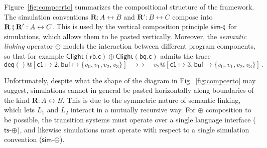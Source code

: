 \documentclass[acmsmall,screen,review,anonymous]{acmart}
\newcommand{\kw}[1]{\ensuremath{ \mathsf{#1} }}
\newcommand{\vcomp}{\fatsemi}
\begin{document}
Figure~\ref{fig:compcerto}
summarizes the compositional structure of the framework.
The simulation conventions $\mathbf{R} : A \leftrightarrow B$ and
$\mathbf{R}' : B \leftrightarrow C$
compose into
$\mathbf{R} \vcomp \mathbf{R}' : A \leftrightarrow C$.
This is used by the vertical composition principle \kw{sim}-$\vcomp$ for simulations,
which allows them to be pasted vertically.
Moreover,
the \emph{semantic linking} operator $\oplus$
models the interaction between different program components,
so that for example
$\kw{Clight}(\kw{rb.c}) \oplus \kw{Clight}(\kw{bq.c})$
admits the trace
\[
  \kw{deq}()@[\kw{c1} \mapsto 2, \kw{buf} \mapsto \{v_0, v_1, v_2, v_3\}]
  \quad\rightarrowtail\quad
  v_2@[\kw{c1} \mapsto 3, \kw{buf} \mapsto \{v_0, v_1, v_2, v_3\}]
  \,.
\]

Unfortunately,
despite what the shape of the diagram in Fig.~\ref{fig:compcerto} may suggest,
simulations cannot in general be pasted horizontally
along boundaries of the kind $\mathbf{R} : A \leftrightarrow B$.
This is due to the symmetric nature of semantic linking,
which lets $L_1$ and $L_2$ interact in a mutually recursive way.
For $\oplus$ composition to be possible,
the transition systems must operate
over a single language interface
($\kw{ts}$-$\oplus$),
and likewise simulations must operate
with respect to a single simulation convention
($\kw{sim}$-$\oplus$).

\end{document}
